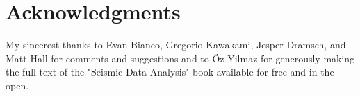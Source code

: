 \section{Acknowledgments}

My sincerest thanks to Evan Bianco, Gregorio Kawakami, Jesper Dramsch, and Matt Hall
for comments and suggestions 
and to Öz Yilmaz for generously making the full text of the
"Seismic Data Analysis" book available for free and in the open.
